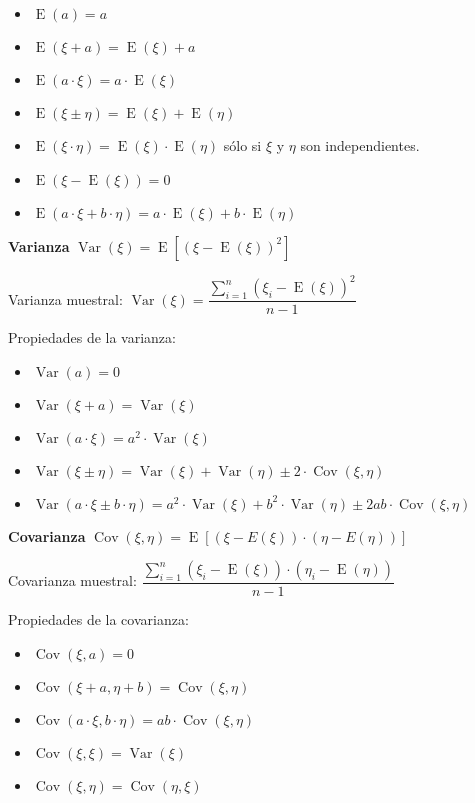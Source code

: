 \documentclass[10pt, a4paper, landscape]{article}
\DeclareMathOperator{\E}{E}
\DeclareMathOperator{\Var}{Var}
\DeclareMathOperator{\Cov}{Cov}
\begin{document}
\begin{multicols}{3}
\begin{itemize}[leftmargin=*]
	\item \( \E(a) = a \)
	\item \( \E(\xi + a) = \E(\xi) + a \)
	\item \( \E(a \cdot \xi) = a \cdot \E(\xi) \)
	\item \( \E(\xi \pm \eta) = \E(\xi) + \E(\eta) \)
	\item \( \E(\xi \cdot \eta) = \E(\xi) \cdot \E(\eta) \) \quad sólo si \( \xi \) y \( \eta \) son independientes.
	\item \( \E(\xi - \E(\xi)) = 0 \)
	\item \( \E(a \cdot \xi + b \cdot \eta) = a \cdot \E(\xi) + b \cdot \E(\eta) \)
\end{itemize}

\textbf{Varianza} \quad \( \Var(\xi) = \E \left[ (\xi - \E(\xi))^{2} \right] \)

Varianza muestral: \quad \( \Var(\xi) = \dfrac{\sum_{i = 1}^{n} (\xi_{i} - \E(\xi))^2}{n - 1} \)

Propiedades de la varianza:

\begin{itemize}[leftmargin=*]
	\item \( \Var(a) = 0 \)
	\item \( \Var(\xi + a) = \Var(\xi) \)
	\item \( \Var(a \cdot \xi) = a^{2} \cdot \Var(\xi) \)
	\item \( \Var(\xi \pm \eta) = \Var(\xi) + \Var(\eta) \pm 2 \cdot \Cov(\xi, \eta) \)
	\item \( \Var(a \cdot \xi \pm b \cdot \eta) = a^{2} \cdot \Var(\xi) + b^{2} \cdot \Var(\eta) \pm 2 a b \cdot \Cov(\xi, \eta) \)
\end{itemize}

\textbf{Covarianza} \quad \( \Cov(\xi, \eta) = \E \left[ (\xi - E(\xi)) \cdot (\eta - E(\eta)) \right] \)

Covarianza muestral: \quad \( \dfrac{\sum_{i = 1}^{n} (\xi_{i} - \E(\xi)) \cdot (\eta_{i} - \E(\eta))}{n - 1} \)

Propiedades de la covarianza:

\begin{itemize}[leftmargin=*]
	\item \( \Cov(\xi, a) = 0 \)
	\item \( \Cov(\xi + a, \eta + b) = \Cov(\xi, \eta) \)
	\item \( \Cov(a \cdot \xi, b \cdot \eta) = a b \cdot \Cov(\xi, \eta) \)
	\item \( \Cov(\xi, \xi) = \Var(\xi) \)
	\item \( \Cov(\xi, \eta) = \Cov(\eta, \xi) \)
\end{itemize}


\end{multicols}
\end{document}

